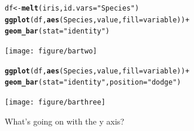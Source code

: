 \documentclass{beamer}\usepackage[]{graphicx}\usepackage[]{color}
\makeatletter
\newcommand{\hlstr}[1]{\textcolor[rgb]{0.192,0.494,0.8}{#1}}%
\newcommand{\hlopt}[1]{\textcolor[rgb]{0,0,0}{#1}}%
\newcommand{\hlstd}[1]{\textcolor[rgb]{0.345,0.345,0.345}{#1}}%
\newcommand{\hlkwb}[1]{\textcolor[rgb]{0.69,0.353,0.396}{#1}}%
\newcommand{\hlkwc}[1]{\textcolor[rgb]{0.333,0.667,0.333}{#1}}%
\newcommand{\hlkwd}[1]{\textcolor[rgb]{0.737,0.353,0.396}{\textbf{#1}}}%
\newenvironment{kframe}{%
 \def\at@end@of@kframe{}%
 \ifinner\ifhmode%
  \def\at@end@of@kframe{\end{minipage}}%
  \begin{minipage}{\columnwidth}%
 \fi\fi%
 \def\FrameCommand##1{\hskip\@totalleftmargin \hskip-\fboxsep
 \colorbox{shadecolor}{##1}\hskip-\fboxsep
     \hskip-\linewidth \hskip-\@totalleftmargin \hskip\columnwidth}%
 \MakeFramed {\advance\hsize-\width
   \@totalleftmargin\z@ \linewidth\hsize
   \@setminipage}}%
 {\par\unskip\endMakeFramed%
 \at@end@of@kframe}
\newenvironment{knitrout}{}{} %
\makeatother
\begin{document}
\begin{frame}[fragile]
\begin{knitrout}\footnotesize
{}\color{fgcolor}\begin{kframe}
\begin{alltt}
\hlstd{df}  \hlkwb{<-} \hlkwd{melt}\hlstd{(iris,} \hlkwc{id.vars} \hlstd{=} \hlstr{"Species"}\hlstd{)}
\hlkwd{ggplot}\hlstd{(df,} \hlkwd{aes}\hlstd{(Species, value,} \hlkwc{fill} \hlstd{= variable))} \hlopt{+}
\hlkwd{geom_bar}\hlstd{(}\hlkwc{stat} \hlstd{=} \hlstr{"identity"}\hlstd{)}
\end{alltt}
\end{kframe}

{\centering \texttt{[image: figure/bartwo]} 

}



\end{knitrout}
\end{frame}


\begin{frame}[fragile]
\begin{knitrout}\footnotesize
{}\color{fgcolor}\begin{kframe}
\begin{alltt}
\hlkwd{ggplot}\hlstd{(df,} \hlkwd{aes}\hlstd{(Species, value,} \hlkwc{fill} \hlstd{= variable))} \hlopt{+}
\hlkwd{geom_bar}\hlstd{(}\hlkwc{stat} \hlstd{=} \hlstr{"identity"}\hlstd{,} \hlkwc{position} \hlstd{=} \hlstr{"dodge"}\hlstd{)}
\end{alltt}
\end{kframe}

{\centering \texttt{[image: figure/barthree]} 

}



\end{knitrout}
What's going on with the y axis?
\end{frame}

\end{document}
